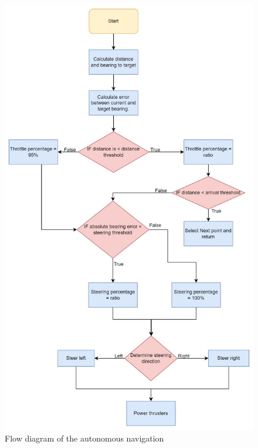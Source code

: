 \begin{figure}
	\begin{center}
		\includegraphics[width=0.7\linewidth]{figures/autoNav.jpg}
		\caption{Flow diagram of the autonomous navigation}
		\label{fig:3:autoNav}
	\end{center}
\end{figure}
